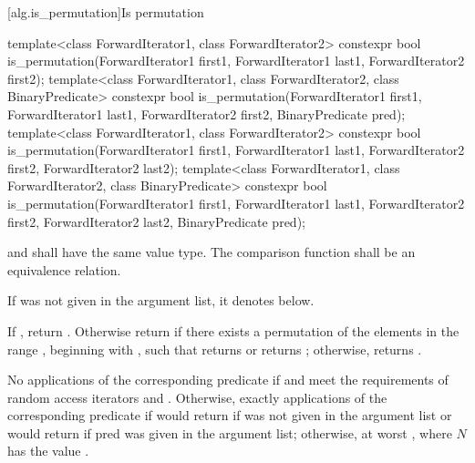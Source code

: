 [alg.is_permutation]{Is permutation}

%
\begin{itemdecl}
template<class ForwardIterator1, class ForwardIterator2>
  constexpr bool is_permutation(ForwardIterator1 first1, ForwardIterator1 last1,
                                ForwardIterator2 first2);
template<class ForwardIterator1, class ForwardIterator2,
         class BinaryPredicate>
  constexpr bool is_permutation(ForwardIterator1 first1, ForwardIterator1 last1,
                                ForwardIterator2 first2, BinaryPredicate pred);
template<class ForwardIterator1, class ForwardIterator2>
  constexpr bool is_permutation(ForwardIterator1 first1, ForwardIterator1 last1,
                                ForwardIterator2 first2, ForwardIterator2 last2);
template<class ForwardIterator1, class ForwardIterator2,
         class BinaryPredicate>
  constexpr bool is_permutation(ForwardIterator1 first1, ForwardIterator1 last1,
                                ForwardIterator2 first2, ForwardIterator2 last2,
                                BinaryPredicate pred);
\end{itemdecl}

\begin{itemdescr}
\pnum
\requires {} and  shall have the same
value type. The comparison function shall be an equivalence relation.

\pnum
\remarks If  was not given in the argument list, it denotes
 below.

\pnum
\returns If , return .
Otherwise return  if there exists a permutation of the elements in the
range , beginning with , such that  returns  or
 returns ; otherwise, returns
.

\pnum
\complexity No applications of the corresponding predicate if 
and  meet the requirements of random access iterators and
.
Otherwise, exactly  applications of the
corresponding predicate if 
would return  if  was not given in the argument list
or  would return  if pred was given in the argument list; otherwise, at
worst , where $N$ has the value .
\end{itemdescr}

